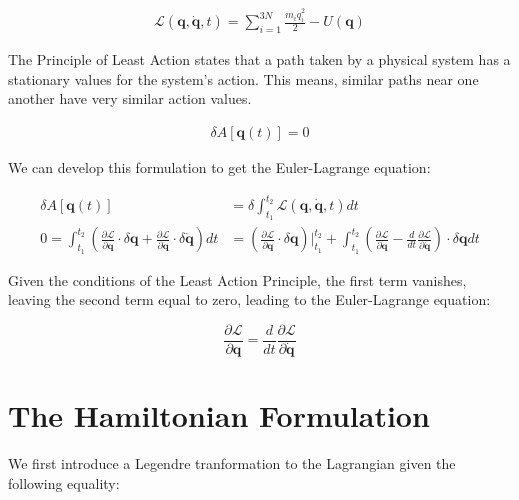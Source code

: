 \documentclass[draft]{agujournal2019}
\begin{document}
\begin{align}
    \mathcal{L} \left(\mathbf{q}, \dot{\mathbf{q}}, t \right) = \sum_{i = 1}^{3N} \frac{m_i \dot{q}_i^2}{2} - U(\mathbf{q})
\end{align}

\begin{definition}
    The Principle of Least Action states that a path taken by a physical system has a stationary values for the system's action. This means, similar paths near one another have very similar action values.

\begin{align}
    \delta A\left[ \mathbf{q}(t) \right] = 0
\end{align}

We can develop this formulation to get the Euler-Lagrange equation:

\begin{align}
    \delta A\left[ \mathbf{q}(t) \right] &= \delta \int_{t_1}^{t_2} \mathcal{L}\left(\mathbf{q}, \dot{\mathbf{q}}, t\right) dt \\
    0 = \int_{t_1}^{t_2} \left( \frac{\partial \mathcal{L}}{\partial \mathbf{q}} \cdot \delta \mathbf{q} + \frac{\partial \mathcal{L}}{\partial \dot{\mathbf{q}}} \cdot \delta \dot{\mathbf{q}} \right)dt &= \left( \frac{\partial \mathcal{L}}{\partial \mathbf{q}} \cdot \delta \mathbf{q} \right) \Big\vert_{t_1}^{t_2} + \int_{t_1}^{t_2} \left( \frac{\partial \mathcal{L}}{\partial \mathbf{q}} - \frac{d}{dt} \frac{\partial \mathcal{L}}{\partial \dot{\mathbf{q}}}  \right) \cdot \delta \mathbf{q} dt
\end{align}

Given the conditions of the Least Action Principle, the first term vanishes, leaving the second term equal to zero, leading to the Euler-Lagrange equation:

\begin{equation}
    \frac{\partial \mathcal{L}}{\partial \mathbf{q}} = \frac{d}{dt} \frac{\partial \mathcal{L}}{\partial \dot{\mathbf{q}}}
\end{equation}

\end{definition}

\section{The Hamiltonian Formulation}

We first introduce a Legendre tranformation to the Lagrangian given the following equality:
\end{document}

